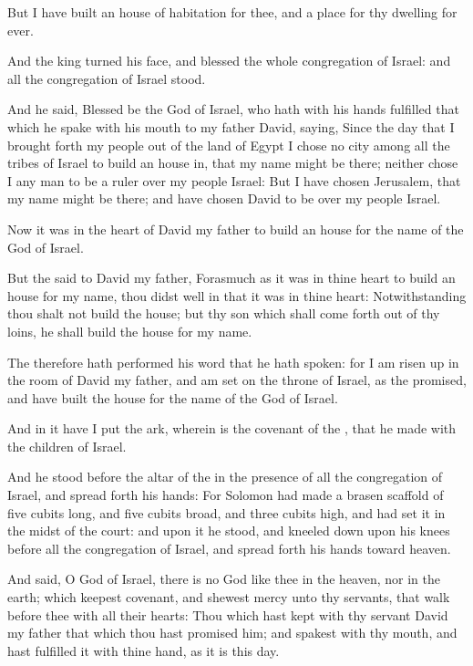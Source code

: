\verse But I have built an house of habitation for thee, and a place for thy dwelling for ever.

\verse And the king turned his face, and blessed the whole congregation of Israel: and all the congregation of Israel stood.

\verse And he said, Blessed be the \LORD God of Israel, who hath with his hands fulfilled that which he spake with his mouth to my father David, saying, \verse Since the day that I brought forth my people out of the land of Egypt I chose no city among all the tribes of Israel to build an house in, that my name might be there; neither chose I any man to be a ruler over my people Israel: \verse But I have chosen Jerusalem, that my name might be there; and have chosen David to be over my people Israel.

\verse Now it was in the heart of David my father to build an house for the name of the \LORD God of Israel.

\verse But the \LORD said to David my father, Forasmuch as it was in thine heart to build an house for my name, thou didst well in that it was in thine heart: \verse Notwithstanding thou shalt not build the house; but thy son which shall come forth out of thy loins, he shall build the house for my name.

\verse The \LORD therefore hath performed his word that he hath spoken: for I am risen up in the room of David my father, and am set on the throne of Israel, as the \LORD promised, and have built the house for the name of the \LORD God of Israel.

\verse And in it have I put the ark, wherein is the covenant of the \LORD, that he made with the children of Israel.

\verse And he stood before the altar of the \LORD in the presence of all the congregation of Israel, and spread forth his hands: \verse For Solomon had made a brasen scaffold of five cubits long, and five cubits broad, and three cubits high, and had set it in the midst of the court: and upon it he stood, and kneeled down upon his knees before all the congregation of Israel, and spread forth his hands toward heaven.

\verse And said, O \LORD God of Israel, there is no God like thee in the heaven, nor in the earth; which keepest covenant, and shewest mercy unto thy servants, that walk before thee with all their hearts: \verse Thou which hast kept with thy servant David my father that which thou hast promised him; and spakest with thy mouth, and hast fulfilled it with thine hand, as it is this day.

